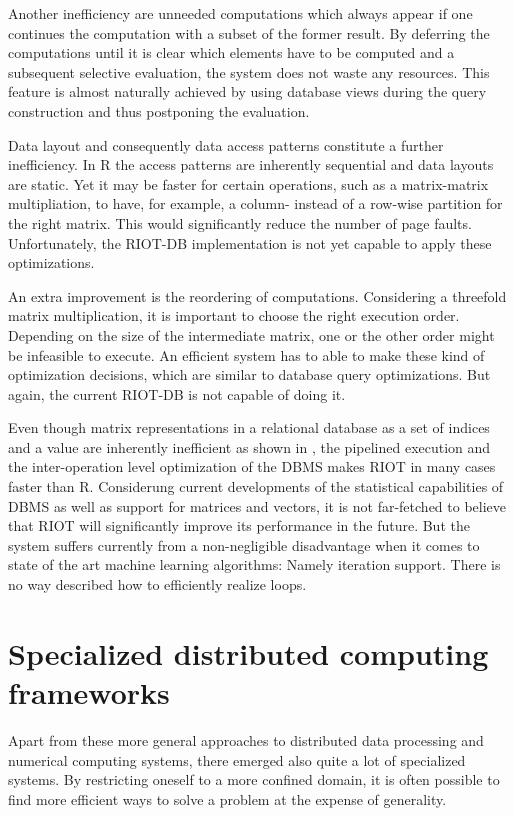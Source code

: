 Another inefficiency are unneeded computations which always appear if one continues the computation with a subset of the former result.
By deferring the computations until it is clear which elements have to be computed and a subsequent selective evaluation, the system does not waste any resources.
This feature is almost naturally achieved by using database views during the query construction and thus postponing the evaluation.

Data layout and consequently data access patterns constitute a further inefficiency.
In R the access patterns are inherently sequential and data layouts are static.
Yet it may be faster for certain operations, such as a matrix-matrix multipliation, to have, for example, a column- instead of a row-wise partition for the right matrix.
This would significantly reduce the number of page faults.
Unfortunately, the RIOT-DB implementation is not yet capable to apply these optimizations.

An extra improvement is the reordering of computations.
Considering a threefold matrix multiplication, it is important to choose the right execution order.
Depending on the size of the intermediate matrix, one or the other order might be infeasible to execute.
An efficient system has to able to make these kind of optimization decisions, which are similar to database query optimizations.
But again, the current RIOT-DB is not capable of doing it.

Even though matrix representations in a relational database as a set of indices and a value are inherently inefficient as shown in \cite{stonebraker:2007a}, the pipelined execution and the inter-operation level optimization of the DBMS makes RIOT in many cases faster than R.
Considerung current developments of the statistical capabilities of DBMS as well as support for matrices and vectors, it is not far-fetched to believe that RIOT will significantly improve its performance in the future.
But the system suffers currently from a non-negligible disadvantage when it comes to state of the art machine learning algorithms: Namely iteration support.
There is no way described how to efficiently realize loops.

\section{Specialized distributed computing frameworks}

Apart from these more general approaches to distributed data processing and numerical computing systems, there emerged also quite a lot of specialized systems.
By restricting oneself to a more confined domain, it is often possible to find more efficient ways to solve a problem at the expense of generality.

